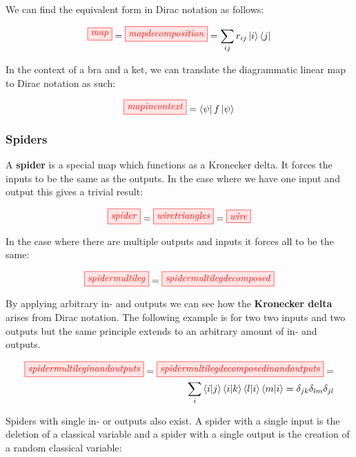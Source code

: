 \documentclass[]{article}
\begin{document}
We can find the equivalent form in Dirac notation as follows:

\begin{equation}
\tikzfig{map} = \tikzfig{mapdecomposition} = \sum_{ij}r_{ij}\ket{i}\bra{j}
\end{equation}

In the context of a bra and a ket, we can translate the diagrammatic linear map to Dirac notation as such:

\begin{equation}
\tikzfig{mapincontext} = \bra{\psi}f\ket{\psi}
\end{equation}

\subsubsection{Spiders}
\label{spiders}

A \textbf{spider} is a special map which functions as a Kronecker delta. It forces the inputs to be the same as the outputs. In the case where we have one input and output this gives a trivial result:

\begin{equation}
\tikzfig{spider} = \tikzfig{wiretriangles} = \tikzfig{wire}
\end{equation}

In the case where there are multiple outputs and inputs it forces all to be the same:

\begin{equation}
\tikzfig{spidermultileg} = \tikzfig{spidermultilegdecomposed}
\end{equation}

By applying arbitrary in- and outputs we can see how the \textbf{Kronecker delta} arises from Dirac notation. The following example is for two two inputs and two outputs but the same principle extends to an arbitrary amount of in- and outputs.

\begin{equation}
\begin{split}
\tikzfig{spidermultileginandoutputs} = \tikzfig{spidermultilegdecomposedinandoutputs} = \\ \sum_{i} \bra{i}\ket{j}\bra{i}\ket{k}\bra{l}\ket{i}\bra{m}\ket{i} = \delta_{jk} \delta_{lm}  \delta_{jl}
\end{split}
\end{equation}

Spiders with single in- or outputs also exist. A spider with a single input is the deletion of a classical variable and a spider with a single output is the creation of a random classical variable:
\end{document}
